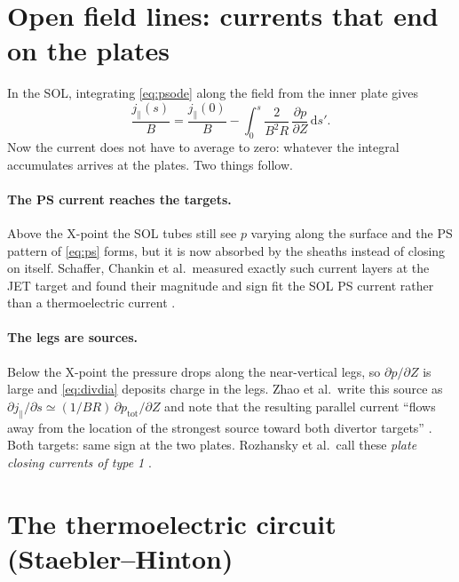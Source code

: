 \documentclass[11pt,a4paper]{article}
\newcommand{\jpar}{j_\parallel}
\newcommand{\dd}{\mathrm{d}}
\begin{document}
\section{Open field lines: currents that end on the plates}

In the SOL, integrating \eqref{eq:psode} along the field from the inner plate gives
\begin{equation}
  \frac{\jpar(s)}{B} = \frac{\jpar(0)}{B} - \int_0^{s}\frac{2}{B^2 R}\,\frac{\partial p}{\partial Z}\,\dd s' .
  \label{eq:psopen}
\end{equation}
Now the current does not have to average to zero: whatever the integral accumulates arrives at the plates. Two things
follow.

\paragraph{The PS current reaches the targets.} Above the X-point the SOL tubes still see $p$ varying along the surface
and the PS pattern of \eqref{eq:ps} forms, but it is now absorbed by the sheaths instead of closing on itself. Schaffer,
Chankin et al.\ measured exactly such current layers at the JET target and found their magnitude and sign fit the SOL
PS current rather than a thermoelectric current \cite{schaffer}.

\paragraph{The legs are sources.} Below the X-point the pressure drops along the near-vertical legs, so
$\partial p/\partial Z$ is large and \eqref{eq:divdia} deposits charge in the legs. Zhao et al.\ write this source as
$\partial\jpar/\partial s \simeq (1/BR)\,\partial p_{\mathrm{tot}}/\partial Z$ and note that the resulting parallel current
``flows away from the location of the strongest source toward both divertor targets'' \cite{zhao2026}. Both targets:
same sign at the two plates. Rozhansky et al.\ call these \emph{plate closing currents of type 1} \cite{rozhansky2020}.

\section{The thermoelectric circuit (Staebler--Hinton)}
\label{sec:thermo}
\end{document}
